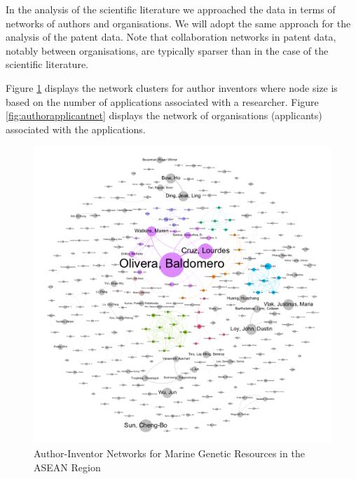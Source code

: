 \documentclass[]{book}
\theoremstyle{definition}
\theoremstyle{definition}
\theoremstyle{definition}
\theoremstyle{remark}
\begin{document}
In the analysis of the scientific literature we approached the data in
terms of networks of authors and organisations. We will adopt the same
approach for the analysis of the patent data. Note that collaboration
networks in patent data, notably between organisations, are typically
sparser than in the case of the scientific literature.

Figure \ref{fig:authorinventornet} displays the network clusters for
author inventors where node size is based on the number of applications
associated with a researcher. Figure \ref{fig:authorapplicantnet}
displays the network of organisations (applicants) associated with the
applications.

\begin{figure}

{\centering \includegraphics[width=1\linewidth]{images-patents/author_inventor_network} 

}

\caption{Author-Inventor Networks for Marine Genetic Resources in the ASEAN Region}\label{fig:authorinventornet}
\end{figure}
\end{document}
